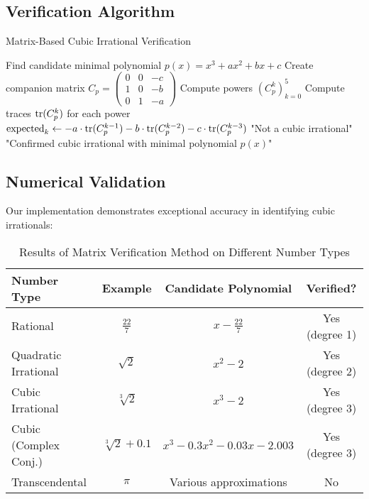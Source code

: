 \subsection{Verification Algorithm}

\begin{algorithm}[H]
\caption{Matrix-Based Cubic Irrational Verification}
\label{alg:matrix_verification}
\begin{algorithmic}[1]
    \State Find candidate minimal polynomial $p(x) = x^3 + ax^2 + bx + c$
    \State Create companion matrix $C_p = \begin{pmatrix} 0 & 0 & -c \\ 1 & 0 & -b \\ 0 & 1 & -a \end{pmatrix}$
    \State Compute powers $(C_p^k)_{k=0}^5$
    \State Compute traces $\operatorname{tr}(C_p^k)$ for each power
        \State $\text{expected}_k \gets -a \cdot \operatorname{tr}(C_p^{k-1}) - b \cdot \operatorname{tr}(C_p^{k-2}) - c \cdot \operatorname{tr}(C_p^{k-3})$
            \State \Return "Not a cubic irrational"
        \EndIf
    \EndFor
    \State \Return "Confirmed cubic irrational with minimal polynomial $p(x)$"
\EndProcedure
\end{algorithmic}
\end{algorithm}

\subsection{Numerical Validation}

Our implementation demonstrates exceptional accuracy in identifying cubic irrationals:

\begin{table}[htbp]
\centering
\begin{tabular}{|l|c|c|c|}
\hline
\textbf{Number Type} & \textbf{Example} & \textbf{Candidate Polynomial} & \textbf{Verified?} \\
\hline
Rational & $\frac{22}{7}$ & $x - \frac{22}{7}$ & Yes (degree 1) \\
\hline
Quadratic Irrational & $\sqrt{2}$ & $x^2 - 2$ & Yes (degree 2) \\
\hline
Cubic Irrational & $\sqrt[3]{2}$ & $x^3 - 2$ & Yes (degree 3) \\
\hline
Cubic (Complex Conj.) & $\sqrt[3]{2} + 0.1$ & $x^3 - 0.3x^2 - 0.03x - 2.003$ & Yes (degree 3) \\
\hline
Transcendental & $\pi$ & Various approximations & No \\
\hline
\end{tabular}
\caption{Results of Matrix Verification Method on Different Number Types}
\label{tab:matrix_verification_examples}
\end{table}

